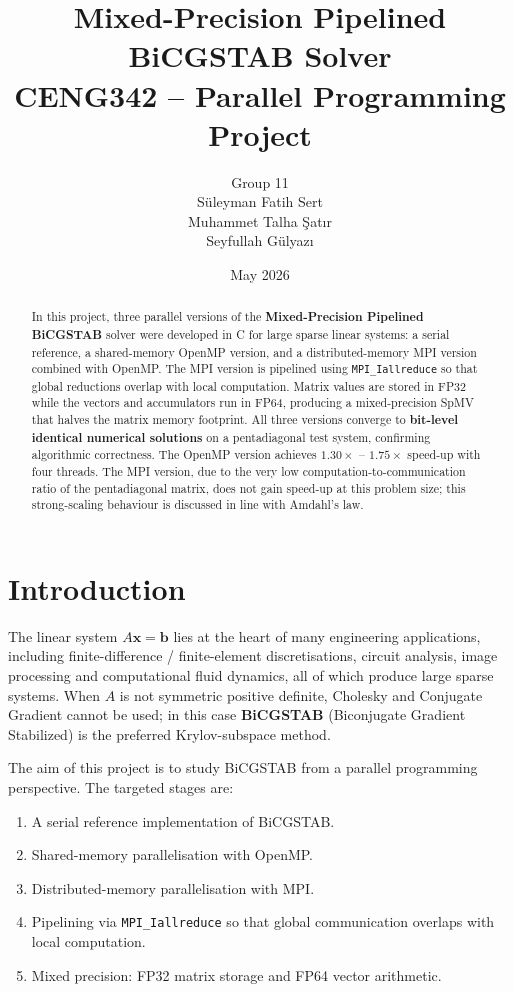 \documentclass[11pt,a4paper]{article}
\title{\textbf{Mixed-Precision Pipelined BiCGSTAB Solver} \\
\large CENG342 -- Parallel Programming Project}
\author{
    Group 11 \\[2pt]
    Süleyman Fatih Sert \\
    Muhammet Talha Şatır \\
    Seyfullah Gülyazı
}
\date{May 2026}
\begin{document}
\maketitle

\begin{abstract}
\noindent In this project, three parallel versions of the
\textbf{Mixed-Precision Pipelined BiCGSTAB} solver were developed in C
for large sparse linear systems: a serial reference, a shared-memory
OpenMP version, and a distributed-memory MPI version combined with
OpenMP. The MPI version is pipelined using \texttt{MPI\_Iallreduce} so
that global reductions overlap with local computation. Matrix values
are stored in FP32 while the vectors and accumulators run in FP64,
producing a mixed-precision SpMV that halves the matrix memory
footprint. All three versions converge to \textbf{bit-level identical
numerical solutions} on a pentadiagonal test system, confirming
algorithmic correctness. The OpenMP version achieves
$1.30\times$ -- $1.75\times$ speed-up with four threads. The MPI
version, due to the very low computation-to-communication ratio of
the pentadiagonal matrix, does not gain speed-up at this problem
size; this strong-scaling behaviour is discussed in line with
Amdahl's law.
\end{abstract}

\section{Introduction}

The linear system $A\mathbf{x} = \mathbf{b}$ lies at the heart of many
engineering applications, including finite-difference / finite-element
discretisations, circuit analysis, image processing and computational
fluid dynamics, all of which produce large sparse systems. When $A$ is
not symmetric positive definite, Cholesky and Conjugate Gradient
cannot be used; in this case \textbf{BiCGSTAB} (Biconjugate Gradient
Stabilized) is the preferred Krylov-subspace method.

The aim of this project is to study BiCGSTAB from a parallel
programming perspective. The targeted stages are:
\begin{enumerate}
    \item A serial reference implementation of BiCGSTAB.
    \item Shared-memory parallelisation with OpenMP.
    \item Distributed-memory parallelisation with MPI.
    \item Pipelining via \texttt{MPI\_Iallreduce} so that global
          communication overlaps with local computation.
    \item Mixed precision: FP32 matrix storage and FP64 vector
          arithmetic.
\end{enumerate}
\end{document}
